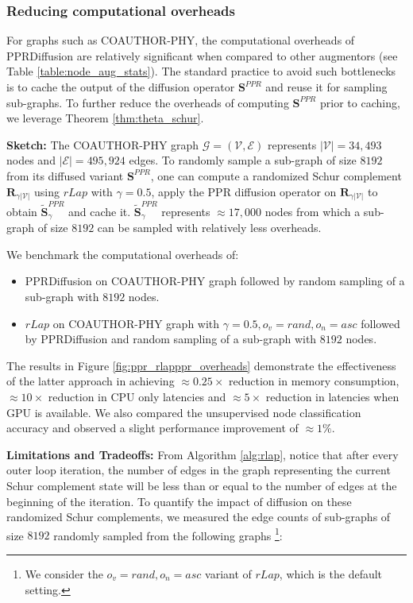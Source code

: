 \documentclass{article}
\def\mR{{\mathbf{R}}}
\def\mS{{\mathbf{S}}}
\def\gE{{\mathcal{E}}}
\def\gG{{\mathcal{G}}}
\def\gV{{\mathcal{V}}}
\theoremstyle{plain}
\theoremstyle{definition}
\theoremstyle{remark}
\begin{document}
\subsubsection{Reducing computational overheads}

For graphs such as COAUTHOR-PHY, the computational overheads of PPRDiffusion are relatively significant when compared to other augmentors (see Table \ref{table:node_aug_stats}). The standard practice to avoid such bottlenecks is to cache the output of the diffusion operator $\mS^{PPR}$ and reuse it for sampling sub-graphs. To further reduce the overheads of computing $\mS^{PPR}$ prior to caching, we leverage Theorem \ref{thm:theta_schur}.

\textbf{Sketch:} The COAUTHOR-PHY graph $\gG = (\gV, \gE)$ represents $|\gV| = 34,493$ nodes and $|\gE| = 495,924$ edges. To randomly sample a sub-graph of size $8192$ from its diffused variant $\mS^{PPR}$, one can compute a randomized Schur complement $\mR_{\gamma|\gV|}$ using $rLap$ with $\gamma=0.5$, apply the PPR diffusion operator on $\mR_{\gamma|\gV|}$ to obtain $\widetilde{\mS}^{PPR}_{\gamma}$ and cache it. $\widetilde{\mS}^{PPR}_{\gamma}$ represents $\approx 17,000$ nodes from which a sub-graph of size $8192$ can be sampled with relatively less overheads.

We benchmark the computational overheads of:

\begin{itemize}
    \item PPRDiffusion on COAUTHOR-PHY graph followed by random sampling of a sub-graph with $8192$ nodes.
    \item $rLap$ on COAUTHOR-PHY graph with $\gamma=0.5, o_v=rand, o_n=asc$ followed by PPRDiffusion and random sampling of a sub-graph with $8192$ nodes.
\end{itemize}

The results in Figure \ref{fig:ppr_rlapppr_overheads} demonstrate the effectiveness of the latter approach in achieving $\approx 0.25 \times$ reduction in memory consumption, $\approx 10 \times$ reduction in CPU only latencies and $\approx 5 \times$ reduction in latencies when GPU is available. We also compared the unsupervised node classification accuracy and observed a slight performance improvement of $\approx 1\%$. 

\textbf{Limitations and Tradeoffs:} From Algorithm \ref{alg:rlap}, notice that after every outer loop iteration, the number of edges in the graph representing the current Schur complement state will be less than or equal to the number of edges at the beginning of the iteration. To quantify the impact of diffusion on these randomized Schur complements, we measured the edge counts of sub-graphs of size $8192$ randomly sampled from the following graphs \footnote{We consider the $ o_v=rand, o_n=asc$ variant of $rLap$, which is the default setting. }:
\end{document}
